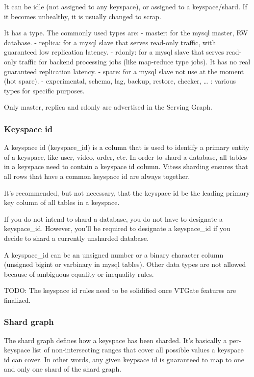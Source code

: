\documentclass{scrartcl}
\begin{document}
It can be idle (not assigned to any keyspace), or assigned to a keyspace/shard. If it becomes unhealthy, it is usually changed to scrap.

It has a type. The commonly used types are:
- master: for the mysql master, RW database.
- replica: for a mysql slave that serves read-only traffic, with guaranteed low replication latency.
- rdonly: for a mysql slave that serves read-only traffic for backend processing jobs (like map-reduce type jobs). It has no real guaranteed replication latency.
- spare: for a mysql slave not use at the moment (hot spare).
- experimental, schema, lag, backup, restore, checker, \ldots{} : various types for specific purposes.

Only master, replica and rdonly are advertised in the Serving Graph.

\subsubsection{Keyspace id}\hypertarget{keyspace-id}{}\label{keyspace-id}

A keyspace id (keyspace\_id) is a column that is used to identify a primary entity
of a keyspace, like user, video, order, etc.
In order to shard a database, all tables in a keyspace need to
contain a keyspace id column.
Vitess sharding ensures that all rows that have a common keyspace id are
always together.

It's recommended, but not necessary, that the keyspace id be the leading primary
key column of all tables in a keyspace.

If you do not intend to shard a database, you do not have to
designate a keyspace\_id.
However, you'll be required to designate a keyspace\_id
if you decide to shard a currently unsharded database.

A keyspace\_id can be an unsigned number or a binary character column (unsigned bigint
or varbinary in mysql tables). Other data types are not allowed because of ambiguous
equality or inequality rules.

TODO: The keyspace id rules need to be solidified once VTGate features are finalized.

\subsubsection{Shard graph}\hypertarget{shard-graph}{}\label{shard-graph}

The shard graph defines how a keyspace has been sharded. It's basically a per-keyspace
list of non-intersecting ranges that cover all possible values a keyspace id can cover.
In other words, any given keypsace id is guaranteed to map to one and only one
shard of the shard graph.
\end{document}
